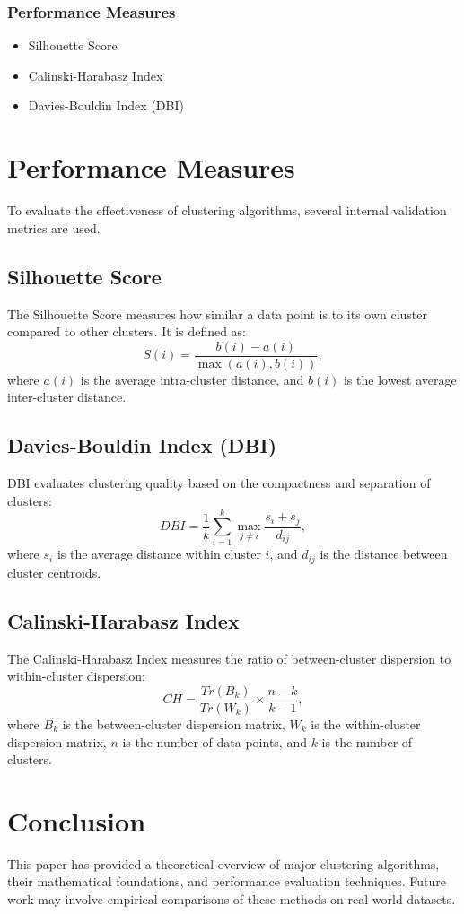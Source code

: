 \documentclass{article}
\begin{document}
\subsubsection{Performance Measures}
\begin{itemize}
    \item Silhouette Score
    \item Calinski-Harabasz Index
    \item Davies-Bouldin Index (DBI)
\end{itemize}

\section{Performance Measures}
To evaluate the effectiveness of clustering algorithms, several internal validation metrics are used.

\subsection{Silhouette Score}
The Silhouette Score measures how similar a data point is to its own cluster compared to other clusters. It is defined as:
\begin{equation}
S(i) = \frac{b(i) - a(i)}{\max(a(i), b(i))},
\end{equation}
where $a(i)$ is the average intra-cluster distance, and $b(i)$ is the lowest average inter-cluster distance.

\subsection{Davies-Bouldin Index (DBI)}
DBI evaluates clustering quality based on the compactness and separation of clusters:
\begin{equation}
DBI = \frac{1}{k} \sum_{i=1}^{k} \max_{j \neq i} \frac{s_i + s_j}{d_{ij}},
\end{equation}
where $s_i$ is the average distance within cluster $i$, and $d_{ij}$ is the distance between cluster centroids.

\subsection{Calinski-Harabasz Index}
The Calinski-Harabasz Index measures the ratio of between-cluster dispersion to within-cluster dispersion:
\begin{equation}
CH = \frac{Tr(B_k)}{Tr(W_k)} \times \frac{n-k}{k-1},
\end{equation}
where $B_k$ is the between-cluster dispersion matrix, $W_k$ is the within-cluster dispersion matrix, $n$ is the number of data points, and $k$ is the number of clusters.

\section{Conclusion}
This paper has provided a theoretical overview of major clustering algorithms, their mathematical foundations, and performance evaluation techniques. Future work may involve empirical comparisons of these methods on real-world datasets.
\end{document}
